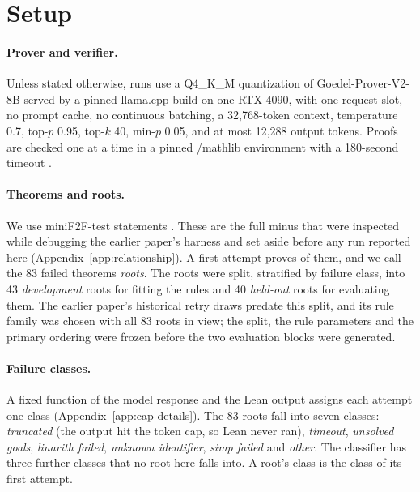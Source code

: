 \section{Setup}
\label{sec:setup}

\paragraph{Prover and verifier.}
Unless stated otherwise, runs use a Q4\_K\_M quantization of Goedel-Prover-V2-8B \citep{lin2025goedel} served by a pinned llama.cpp build \citep{gerganov2023llamacpp} on one RTX 4090, with one request slot, no prompt cache, no continuous batching, a 32,768-token context, temperature 0.7, top-$p$ 0.95, top-$k$ 40, min-$p$ 0.05, and at most 12,288 output tokens.  Proofs are checked one at a time in a pinned \lean{}/mathlib environment with a 180-second timeout \citep{moura2021lean,mathlib2020}.

\paragraph{Theorems and roots.}
We use \MiniFTwoFUsed{} miniF2F-test statements \citep{zheng2021minif2f}.  These are the full \MiniFTwoFTest{} minus \MiniFTwoFExcluded{} that were inspected while debugging the earlier paper's harness and set aside before any run reported here (Appendix~\ref{app:relationship}).  A first attempt proves \SchedStageOneVerified{} of them, and we call the 83 failed theorems \emph{roots}.  The roots were split, stratified by failure class, into 43 \emph{development} roots for fitting the rules and 40 \emph{held-out} roots for evaluating them.  The earlier paper's historical retry draws predate this split, and its rule family was chosen with all 83 roots in view; the split, the rule parameters and the primary ordering were frozen before the two evaluation blocks were generated.

\paragraph{Failure classes.}
A fixed function of the model response and the Lean output assigns each attempt one class (Appendix~\ref{app:cap-details}).  The 83 roots fall into seven classes: \emph{truncated} (the output hit the token cap, so Lean never ran), \emph{timeout}, \emph{unsolved goals}, \emph{linarith failed}, \emph{unknown identifier}, \emph{simp failed} and \emph{other}.  The classifier has three further classes that no root here falls into.  A root's class is the class of its first attempt.


